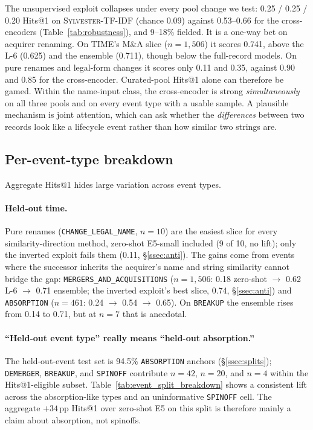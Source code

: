 \documentclass[sigconf]{acmart}
\begin{document}
The unsupervised exploit collapses under every pool change we
test: 0.25 / 0.25 / 0.20 Hits@1 on \textsc{Sylvester-TF-IDF}
(chance 0.09) against 0.53--0.66 for the cross-encoders
(Table~\ref{tab:robustness}), and 9--18\% fielded. It is a one-way
bet on acquirer renaming. On TIME's M\&A slice ($n{=}1{,}506$) it
scores 0.741, above the L-6 (0.625) and the ensemble (0.711),
though below the full-record models. On pure renames and legal-form
changes it scores only 0.11 and 0.35, against 0.90 and 0.85 for the
cross-encoder. Curated-pool Hits@1 alone can therefore be gamed.
Within the name-input class, the cross-encoder is strong
\emph{simultaneously} on all three pools and on every event type
with a usable sample. A plausible mechanism is joint attention,
which can ask whether the \emph{differences} between two records
look like a lifecycle event rather than how similar two strings
are.

\subsection{Per-event-type breakdown}
\label{ssec:per_event}

Aggregate Hits@1 hides large variation across event types.

\paragraph{Held-out time.} Pure renames
(\texttt{CHANGE\_LEGAL\_NAME}, $n{=}10$) are the easiest slice for
every similarity-direction method, zero-shot E5-small included
(9 of 10, no lift); only the inverted exploit fails them
(0.11, \S\ref{ssec:anti}). The gains come from events where the
successor inherits the acquirer's name and string similarity cannot
bridge the gap: \texttt{MERGERS\_AND\_ACQUISITIONS} ($n{=}1{,}506$: 0.18
zero-shot $\to$ 0.62 L-6 $\to$ 0.71 ensemble; the inverted
exploit's best slice, 0.74, \S\ref{ssec:anti}) and
\texttt{ABSORPTION} ($n{=}461$: 0.24 $\to$ 0.54 $\to$ 0.65). On
\texttt{BREAKUP} the ensemble rises from 0.14 to 0.71, but at
$n{=}7$ that is anecdotal.

\paragraph{``Held-out event type'' really means ``held-out
absorption.''} The held-out-event test set is 94.5\%
\texttt{ABSORPTION} anchors (\S\ref{ssec:splits});
\texttt{DEMERGER}, \texttt{BREAKUP}, and \texttt{SPINOFF}
contribute $n{=}42$, $n{=}20$, and $n{=}4$ within the Hits@1-eligible
subset. Table~\ref{tab:event_split_breakdown} shows a consistent
lift across the absorption-like types and an uninformative
\texttt{SPINOFF} cell. The aggregate $+34$\,pp Hits@1 over
zero-shot E5 on this split is therefore mainly a claim about
absorption, not spinoffs.
\end{document}
